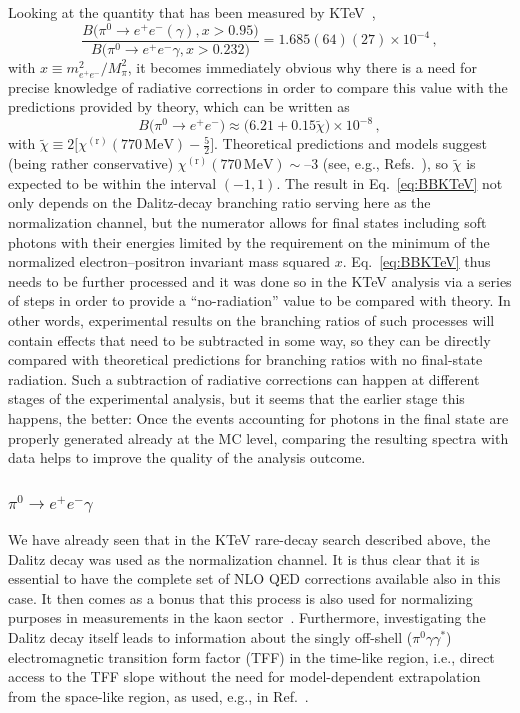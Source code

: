 Looking at the quantity that has been measured by KTeV~\cite{KTeV:2006pwx},
%
\begin{equation}
\frac{B\bigl(\pi^0\to e^+e^-(\gamma),x>0.95\bigl)}
{B\bigl(\pi^0\to e^+e^-\gamma,x>0.232\bigl)}
=1.685(64)(27)\times10^{-4}\,,
\label{eq:BBKTeV}
\end{equation}
%
with $x\equiv m_{e^+e^-}^2/M_\pi^2$, it becomes immediately obvious why there is a need for precise knowledge of radiative corrections in order to compare this value with the predictions provided by theory, which can be written as
%
\begin{equation}
B\bigl(\pi^0\to e^+e^-\bigr)
\approx\bigl(6.21+0.15\widetilde\chi\bigr)\times10^{-8}\,,
\end{equation}
%
with $\widetilde\chi\equiv2\big[\chi^{(\mathrm{r})}(770\,\mathrm{MeV})-\frac52\big]$.
Theoretical predictions and models suggest (being rather conservative) $\chi^{(\mathrm{r})}(770\,\mathrm{MeV})\sim$--3 (see, e.g., Refs.~\cite{Knecht:1999gb,Dorokhov:2007bd,Husek:2015wta,Hoferichter:2021lct}), so $\widetilde\chi$ is expected to be within the interval $(-1,1)$.
The result in Eq.~\ref{eq:BBKTeV} not only depends on the Dalitz-decay branching ratio serving here as the normalization channel, but the numerator allows for final states including soft photons with their energies limited by the requirement on the minimum of the normalized electron--positron invariant mass squared $x$.
Eq.~\ref{eq:BBKTeV} thus needs to be further processed and it was done so in the KTeV analysis via a series of steps in order to provide a ``no-radiation'' value to be compared with theory.
In other words, experimental results on the branching ratios of such processes will contain effects that need to be subtracted in some way, so they can be directly compared with theoretical predictions for branching ratios with no final-state radiation.
Such a subtraction of radiative corrections can happen at different stages of the experimental analysis, but it seems that the earlier stage this happens, the better:
Once the events accounting for photons in the final state are properly generated already at the MC level, comparing the resulting spectra with data helps to improve the quality of the analysis outcome.


\subsubsection{\texorpdfstring{$\pi^0\to e^+e^-\gamma$}{pi0->eeg}}

We have already seen that in the KTeV rare-decay search described above, the Dalitz decay was used as the normalization channel.
It is thus clear that it is essential to have the complete set of NLO QED corrections available also in this case.
It then comes as a bonus that this process is also used for normalizing purposes in measurements in the kaon sector~\cite{Husek:2018qdx}.
Furthermore, investigating the Dalitz decay itself leads to information about the singly off-shell ($\pi^0\gamma\gamma^*$) electromagnetic transition form factor (TFF) in the time-like region, i.e., direct access to the TFF slope without the need for model-dependent extrapolation from the space-like region, as used, e.g., in Ref.~\cite{CELLO:1990klc}.

